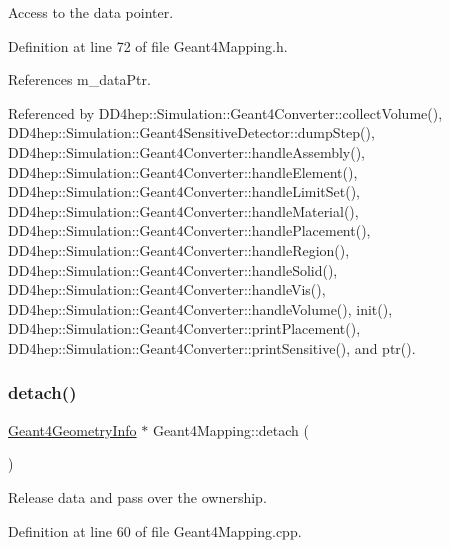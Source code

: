 Access to the data pointer. 



Definition at line 72 of file Geant4\+Mapping.\+h.



References m\+\_\+data\+Ptr.



Referenced by D\+D4hep\+::\+Simulation\+::\+Geant4\+Converter\+::collect\+Volume(), D\+D4hep\+::\+Simulation\+::\+Geant4\+Sensitive\+Detector\+::dump\+Step(), D\+D4hep\+::\+Simulation\+::\+Geant4\+Converter\+::handle\+Assembly(), D\+D4hep\+::\+Simulation\+::\+Geant4\+Converter\+::handle\+Element(), D\+D4hep\+::\+Simulation\+::\+Geant4\+Converter\+::handle\+Limit\+Set(), D\+D4hep\+::\+Simulation\+::\+Geant4\+Converter\+::handle\+Material(), D\+D4hep\+::\+Simulation\+::\+Geant4\+Converter\+::handle\+Placement(), D\+D4hep\+::\+Simulation\+::\+Geant4\+Converter\+::handle\+Region(), D\+D4hep\+::\+Simulation\+::\+Geant4\+Converter\+::handle\+Solid(), D\+D4hep\+::\+Simulation\+::\+Geant4\+Converter\+::handle\+Vis(), D\+D4hep\+::\+Simulation\+::\+Geant4\+Converter\+::handle\+Volume(), init(), D\+D4hep\+::\+Simulation\+::\+Geant4\+Converter\+::print\+Placement(), D\+D4hep\+::\+Simulation\+::\+Geant4\+Converter\+::print\+Sensitive(), and ptr().

\hypertarget{class_d_d4hep_1_1_simulation_1_1_geant4_mapping_a9d02ac3bbf930ce7a07694a296eaa8a2}{}\label{class_d_d4hep_1_1_simulation_1_1_geant4_mapping_a9d02ac3bbf930ce7a07694a296eaa8a2} 
\subsubsection{\texorpdfstring{detach()}{detach()}}
{\footnotesize\ttfamily \hyperlink{class_d_d4hep_1_1_simulation_1_1_geant4_geometry_info}{Geant4\+Geometry\+Info} $\ast$ Geant4\+Mapping\+::detach (\begin{DoxyParamCaption}{ }\end{DoxyParamCaption})}



Release data and pass over the ownership. 



Definition at line 60 of file Geant4\+Mapping.\+cpp.



